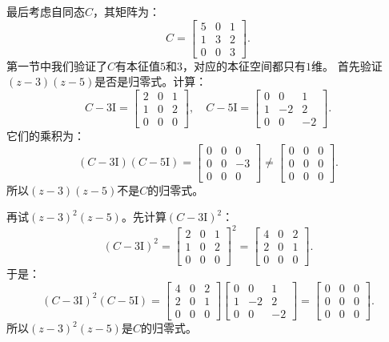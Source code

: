 \documentclass[12pt,UTF8]{ctexbook}
\begin{document}
最后考虑自同态$C$，其矩阵为：
$$
C = \begin{bmatrix} 5 & 0 & 1 \\ 1 & 3 & 2 \\ 0 & 0 & 3 \end{bmatrix}.
$$
第一节中我们验证了$C$有本征值$5$和$3$，对应的本征空间都只有$1$维。
首先验证$(z-3)(z-5)$是否是归零式。计算：
$$
C - 3\mathrm{I} = \begin{bmatrix} 2 & 0 & 1 \\ 1 & 0 & 2 \\ 0 & 0 & 0 \end{bmatrix}, \quad C - 5\mathrm{I} = \begin{bmatrix} 0 & 0 & 1 \\ 1 & -2 & 2 \\ 0 & 0 & -2 \end{bmatrix}.
$$
它们的乘积为：
$$
(C-3\mathrm{I})(C-5\mathrm{I}) = \begin{bmatrix} 0 & 0 & 0 \\ 0 & 0 & -3 \\ 0 & 0 & 0 \end{bmatrix} \neq \begin{bmatrix} 0 & 0 & 0 \\ 0 & 0 & 0 \\ 0 & 0 & 0 \end{bmatrix}.
$$
所以$(z-3)(z-5)$不是$C$的归零式。

再试$(z-3)^2(z-5)$。先计算$(C-3\mathrm{I})^2$：
$$
(C-3\mathrm{I})^2 = \begin{bmatrix} 2 & 0 & 1 \\ 1 & 0 & 2 \\ 0 & 0 & 0 \end{bmatrix}^2 = \begin{bmatrix} 4 & 0 & 2 \\ 2 & 0 & 1 \\ 0 & 0 & 0 \end{bmatrix}.
$$
于是：
$$
(C-3\mathrm{I})^2(C-5\mathrm{I}) = \begin{bmatrix} 4 & 0 & 2 \\ 2 & 0 & 1 \\ 0 & 0 & 0 \end{bmatrix}\begin{bmatrix} 0 & 0 & 1 \\ 1 & -2 & 2 \\ 0 & 0 & -2 \end{bmatrix} = \begin{bmatrix} 0 & 0 & 0 \\ 0 & 0 & 0 \\ 0 & 0 & 0 \end{bmatrix}.
$$
所以$(z-3)^2(z-5)$是$C$的归零式。
\end{document}
